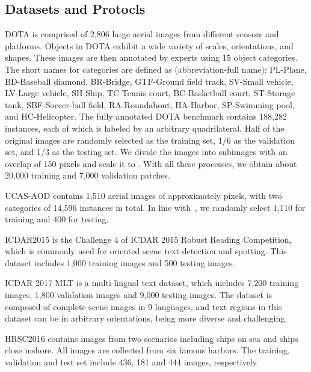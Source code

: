 \documentclass[final]{cvpr}
\begin{document}
\subsection{Datasets and Protocls}
DOTA \cite{xia2018dota} is comprised of 2,806 large aerial images from different sensors and platforms. Objects in DOTA exhibit a wide variety of scales, orientations, and shapes. These images are then annotated by experts using 15 object categories. 
The short names for categories are defined as (abbreviation-full name): PL-Plane, BD-Baseball diamond, BR-Bridge, GTF-Ground field track, SV-Small vehicle, LV-Large vehicle, SH-Ship, TC-Tennis court, BC-Basketball court, ST-Storage tank, SBF-Soccer-ball field, RA-Roundabout, HA-Harbor, SP-Swimming pool, and HC-Helicopter. 
The fully annotated DOTA benchmark contains 188,282 instances, each of which is labeled by an arbitrary quadrilateral. 
Half of the original images are randomly selected as the training set, 1/6 as the validation set, and 1/3 as the testing set. We divide the images into  subimages with an overlap of 150 pixels and scale it to . With all these processes, we obtain about 20,000 training and 7,000 validation patches.

UCAS-AOD \cite{zhu2015orientation} contains 1,510 aerial images of approximately  pixels, with two categories of 14,596 instances in total. In line with~\cite{azimi2018towards,xia2018dota}, we randomly select 1,110 for training and 400 for testing. 

ICDAR2015 \cite{karatzas2015icdar} is the Challenge 4 of ICDAR 2015 Robust Reading Competition, which is commonly used for oriented scene text detection and spotting. This dataset includes 1,000 training images and 500 testing images.

ICDAR 2017 MLT \cite{nayef2017icdar2017} is a multi-lingual text dataset, which includes 7,200 training images, 1,800 validation images and 9,000 testing images. The dataset is composed of complete scene images in 9 languages, and text regions in this dataset can be in arbitrary orientations, being more diverse and challenging.

HRSC2016 \cite{liu2017high} contains images from two scenarios including ships on sea and ships close inshore. All images are collected from six famous harbors. The training, validation and test set include 436, 181 and 444 images, respectively.
\end{document}
